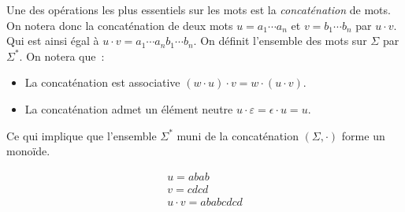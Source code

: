 \begin{definition}
    Une des opérations les plus essentiels sur les mots est la
    \textit{concaténation} de mots. On notera donc la concaténation de deux mots
    \(u = a_1 \cdots a_n\) et \(v = b_1 \cdots b_n\) par \(u \cdot v\). Qui est
    ainsi égal à \(u \cdot v = a_1 \cdots a_n b_1 \cdots b_n\). On définit
    l'ensemble des mots sur \(\Sigma\) par \(\Sigma ^ *\). On notera que~:

    \begin{itemize}[label=\textbullet]
        \item La concaténation est associative \((w \cdot u) \cdot v = w \cdot (u \cdot v)\).
        \item La concaténation admet un élément neutre \(u \cdot \varepsilon = \epsilon \cdot
              u = u\).
    \end{itemize}

    \noindent Ce qui implique que l'ensemble \(\Sigma ^ *\) muni de la concaténation
    \((\Sigma, \cdot)\) forme un monoïde.
\end{definition}

\begin{example}
    \begin{gather*}
        u = abab \\
        v = cdcd \\
        u \cdot v = ababcdcd
    \end{gather*}
\end{example}



